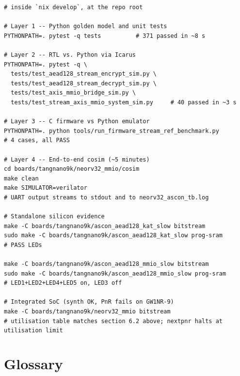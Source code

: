 \documentclass[11pt,a4paper]{article}
\begin{document}
\begin{lstlisting}[language=shell]
# inside `nix develop`, at the repo root

# Layer 1 -- Python golden model and unit tests
PYTHONPATH=. pytest -q tests          # 371 passed in ~8 s

# Layer 2 -- RTL vs. Python via Icarus
PYTHONPATH=. pytest -q \
  tests/test_aead128_stream_encrypt_sim.py \
  tests/test_aead128_stream_decrypt_sim.py \
  tests/test_axis_mmio_bridge_sim.py \
  tests/test_stream_axis_mmio_system_sim.py     # 40 passed in ~3 s

# Layer 3 -- C firmware vs Python emulator
PYTHONPATH=. python tools/run_firmware_stream_ref_benchmark.py
# 4 cases, all PASS

# Layer 4 -- End-to-end cosim (~5 minutes)
cd boards/tangnano9k/neorv32_mmio/cosim
make clean
make SIMULATOR=verilator
# UART output streams to stdout and to neorv32_ascon_tb.log

# Standalone silicon evidence
make -C boards/tangnano9k/ascon_aead128_kat_slow bitstream
sudo make -C boards/tangnano9k/ascon_aead128_kat_slow prog-sram
# PASS LEDs

make -C boards/tangnano9k/ascon_aead128_mmio_slow bitstream
sudo make -C boards/tangnano9k/ascon_aead128_mmio_slow prog-sram
# LED1+LED2+LED4+LED5 on, LED3 off

# Integrated SoC (synth OK, PnR fails on GW1NR-9)
make -C boards/tangnano9k/neorv32_mmio bitstream
# utilisation table matches section 6.2 above; nextpnr halts at utilisation limit
\end{lstlisting}

\section{Glossary}
\end{document}
